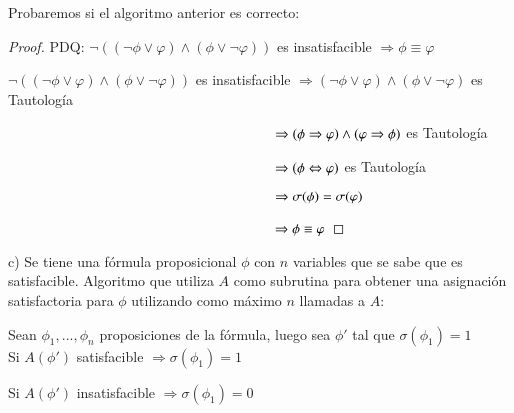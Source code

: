 \documentclass[
	spanish, %
	letterpaper, oneside
]{article}
\begin{document}
Probaremos si el algoritmo anterior es correcto:

\begin{proof}
    PDQ: $\neg ((\neg \phi \vee \varphi)\land(\phi \vee \neg \varphi))$ es insatisfacible $\Rightarrow \phi \equiv \varphi$

    $\neg ((\neg \phi \vee \varphi)\land(\phi \vee \neg \varphi))$ es insatisfacible $\Rightarrow (\neg \phi \vee \varphi)\land(\phi \vee \neg \varphi)$ es Tautología

    $\hspace{67mm} \Rightarrow (\phi \Rightarrow \varphi) \land (\varphi \Rightarrow \phi)$ es Tautología

    $\hspace{67mm} \Rightarrow (\phi \Leftrightarrow \varphi)$ es Tautología

    $\hspace{67mm} \Rightarrow \sigma(\phi) = \sigma(\varphi)$

    $\hspace{67mm} \Rightarrow \phi \equiv \varphi$
    
\end{proof}

\newpage

c) Se tiene una fórmula proposicional $\phi$ con $n$ variables que se sabe que es satisfacible. Algoritmo que utiliza $A$ como subrutina para obtener una asignación satisfactoria para $\phi$ utilizando como máximo $n$ llamadas a $A$:

Sean $\phi_1,...,\phi_n$ proposiciones de la fórmula, luego sea $\phi '$ tal que $\sigma(\phi_1)=1$\\

Si $A(\phi')$ satisfacible $\Rightarrow \sigma(\phi_1)=1$

Si $A(\phi')$ insatisfacible $\Rightarrow \sigma(\phi_1)=0$\\
\end{document}
